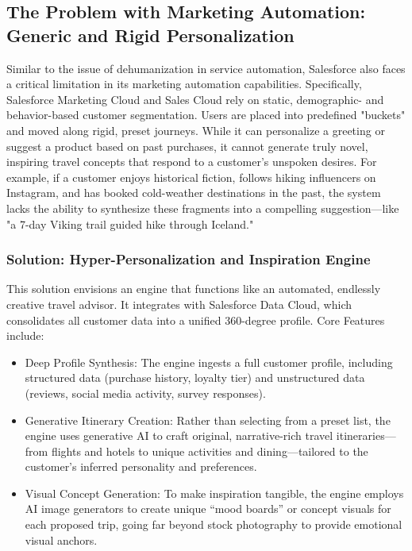 \subsection{The Problem with Marketing Automation: Generic and Rigid Personalization}

Similar to the issue of dehumanization in service automation, Salesforce also faces a critical limitation in its marketing automation capabilities. Specifically, Salesforce Marketing Cloud and Sales Cloud rely on static, demographic- and behavior-based customer segmentation. Users are placed into predefined "buckets" and moved along rigid, preset journeys. While it can personalize a greeting or suggest a product based on past purchases, it cannot generate truly novel, inspiring travel concepts that respond to a customer's unspoken desires. For example, if a customer enjoys historical fiction, follows hiking influencers on Instagram, and has booked cold-weather destinations in the past, the system lacks the ability to synthesize these fragments into a compelling suggestion—like "a 7-day Viking trail guided hike through Iceland."

\subsubsection{Solution: Hyper-Personalization and Inspiration Engine}
This solution envisions an engine that functions like an automated, endlessly creative travel advisor. It integrates with Salesforce Data Cloud, which consolidates all customer data into a unified 360-degree profile. Core Features include:

\begin{itemize}
    \item Deep Profile Synthesis: The engine ingests a full customer profile, including structured data (purchase history, loyalty tier) and unstructured data (reviews, social media activity, survey responses).
    \item Generative Itinerary Creation: Rather than selecting from a preset list, the engine uses generative AI to craft original, narrative-rich travel itineraries—from flights and hotels to unique activities and dining—tailored to the customer's inferred personality and preferences.
    \item Visual Concept Generation: To make inspiration tangible, the engine employs AI image generators to create unique “mood boards” or concept visuals for each proposed trip, going far beyond stock photography to provide emotional visual anchors.
\end{itemize}

